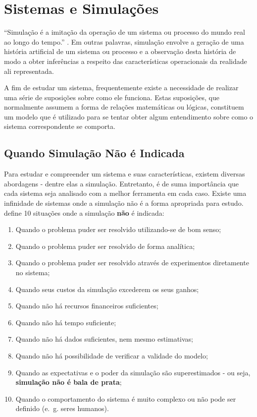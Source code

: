 \chapter{\label{chap:simulation}Sistemas e Simulações}

``Simulação é a imitação da operação de um sistema ou processo do mundo real ao
longo do tempo.'' \cite{Banks}. Em outras palavras, simulação envolve a geração
de uma história artificial de um sistema ou processo e a observação desta
história de modo a obter inferências a respeito das características operacionais
da realidade ali representada.

A fim de estudar um sistema, frequentemente existe a necessidade de realizar uma
série de suposições sobre como ele funciona. Estas suposições, que normalmente
assumem a forma de relações matemáticas ou lógicas, constituem um modelo que é
utilizado para se tentar obter algum entendimento sobre como o sistema
correspondente se comporta.

\section{Quando Simulação Não é Indicada}

Para estudar e compreender um sistema e suas características, existem diversas
abordagens - dentre elas a simulação. Entretanto, é de suma importância que cada
sistema seja analisado com a melhor ferramenta em cada caso. Existe uma
infinidade de sistemas onde a simulação não é a forma apropriada para estudo.
\cite{BanksGibson} define 10 situações onde a simulação \textbf{não} é indicada:

\begin{enumerate}
\item Quando o problema puder ser resolvido utilizando-se de bom senso;
\item Quando o problema puder ser resolvido de forma analítica;
\item Quando o problema puder ser resolvido através de experimentos diretamente
      no sistema;
\item Quando seus custos da simulação excederem os seus ganhos;
\item Quando não há recursos financeiros suficientes;
\item Quando não há tempo suficiente;
\item Quando não há dados suficientes, nem mesmo estimativas;
\item Quando não há possibilidade de verificar a validade do modelo;
\item Quando as expectativas e o poder da simulação são superestimados - ou
      seja, \textbf{simulação não é bala de prata};
\item Quando o comportamento do sistema é muito complexo ou não pode ser
      definido (e.~g. seres humanos).
\end{enumerate}

